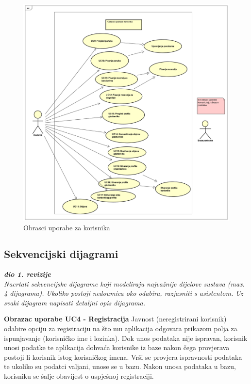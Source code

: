 		\begin{figure}[H]
			\begin{center}
				\includegraphics[width=17cm]{slike/korisnik.PNG}
			\end{center}
			\caption{Obrasci uporabe za korisnika}
			\label{fig:ou3}
		\end{figure}
				
				
			\subsection{Sekvencijski dijagrami}
				
				\textbf{\textit{dio 1. revizije}}\\
				
				\textit{Nacrtati sekvencijske dijagrame koji modeliraju najvažnije dijelove sustava (max. 4 dijagrama). Ukoliko postoji nedoumica oko odabira, razjasniti s asistentom. Uz svaki dijagram napisati detaljni opis dijagrama.}
				\eject
				
				\textbf{Obrazac uporabe UC4 - Registracija}
				\newline
				Javnost (neregistrirani korisnik) odabire opciju za registraciju na što mu aplikacija odgovara prikazom polja za ispunjavanje (korisničko ime i lozinka). Dok unos podataka nije ispravan, korisnik unosi podatke te aplikacija dohvaća korisnike iz baze nakon čega provjerava postoji li korisnik istog korisničkog imena. Vrši se provjera ispravnosti podataka te ukoliko su podatci valjani, unose se u bazu. Nakon unosa podataka u bazu, korisniku se šalje obavijest o uspješnoj registraciji. 
				
